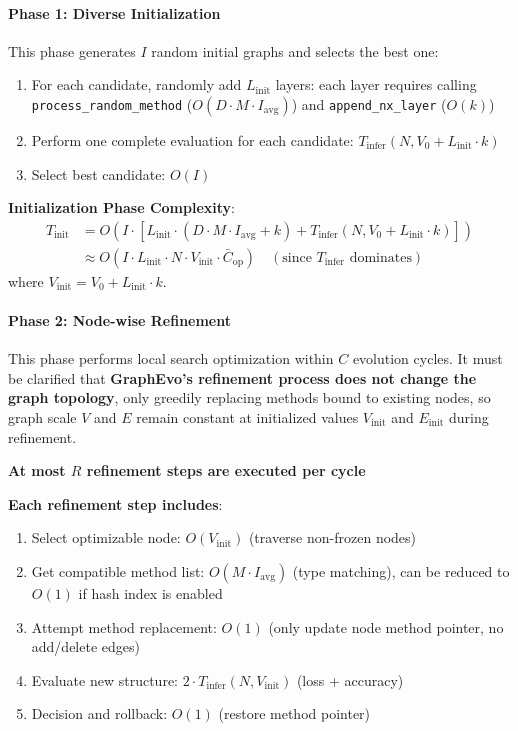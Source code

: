 \paragraph{Phase 1: Diverse Initialization}
This phase generates $I$ random initial graphs and selects the best one:
\begin{enumerate}
    \item For each candidate, randomly add $L_{\mathrm{init}}$ layers: each layer requires calling \texttt{process\_random\_method} ($O(D \cdot M \cdot I_{\mathrm{avg}})$) and \texttt{append\_nx\_layer} ($O(k)$)
    \item Perform one complete evaluation for each candidate: $T_{\mathrm{infer}}(N, V_0 + L_{\mathrm{init}} \cdot k)$
    \item Select best candidate: $O(I)$
\end{enumerate}

\textbf{Initialization Phase Complexity}:
\begin{equation}
\begin{aligned}
    T_{\mathrm{init}} &= O\left( I \cdot \left[ L_{\mathrm{init}} \cdot (D \cdot M \cdot I_{\mathrm{avg}} + k) + T_{\mathrm{infer}}(N, V_0 + L_{\mathrm{init}} \cdot k) \right] \right) \\
    &\approx O(I \cdot L_{\mathrm{init}} \cdot N \cdot V_{\mathrm{init}} \cdot \bar{C}_{\mathrm{op}}) \quad (\text{since } T_{\mathrm{infer}} \text{ dominates})
\end{aligned}
\end{equation}
where $V_{\mathrm{init}} = V_0 + L_{\mathrm{init}} \cdot k$.

\paragraph{Phase 2: Node-wise Refinement}
This phase performs local search optimization within $C$ evolution cycles. It must be clarified that \textbf{GraphEvo's refinement process does not change the graph topology}, only greedily replacing methods bound to existing nodes, so graph scale $V$ and $E$ remain constant at initialized values $V_{\mathrm{init}}$ and $E_{\mathrm{init}}$ during refinement.

\textbf{At most $R$ refinement steps are executed per cycle}

\textbf{Each refinement step includes}:
\begin{enumerate}
    \item Select optimizable node: $O(V_{\mathrm{init}})$ (traverse non-frozen nodes)
    \item Get compatible method list: $O(M \cdot I_{\mathrm{avg}})$ (type matching), can be reduced to $O(1)$ if hash index is enabled
    \item Attempt method replacement: $O(1)$ (only update node method pointer, no add/delete edges)
    \item Evaluate new structure: $2 \cdot T_{\mathrm{infer}}(N, V_{\mathrm{init}})$ (loss + accuracy)
    \item Decision and rollback: $O(1)$ (restore method pointer)
\end{enumerate}

